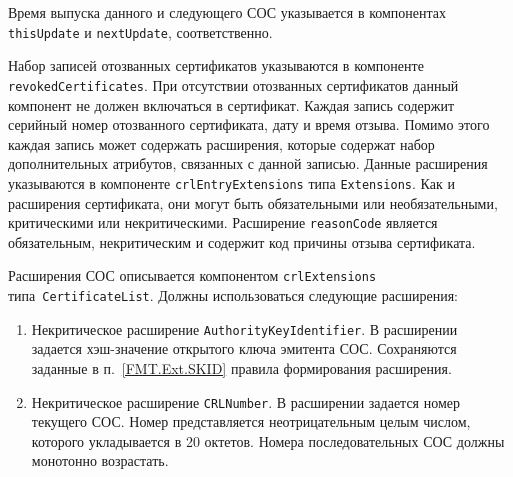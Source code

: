 Время выпуска данного и следующего СОС указывается в 
компонентах \texttt{thisUpdate} и \texttt{nextUpdate}, 
соответственно.

Набор записей отозванных сертификатов указываются в компоненте 
\texttt{revokedCertificates}. При отсутствии отозванных  
сертификатов данный компонент не должен включаться в сертификат.
Каждая запись содержит серийный номер отозванного 
сертификата, дату и время отзыва. Помимо этого
каждая запись может содержать расширения, которые содержат
набор дополнительных атрибутов, связанных с данной записью. 
Данные расширения указываются в компоненте 
\texttt{crlEntryExtensions} типа \texttt{Extensions}. Как 
и расширения сертификата, они могут быть обязательными или необязательными,
критическими или некритическими. Расширение \texttt{reasonCode}
является обязательным, некритическим и содержит код причины 
отзыва сертификата.  



Расширения СОС описывается компонентом \texttt{crlExtensions}
типа~\texttt{CertificateList}. Должны использоваться следующие расширения: 
\begin{enumerate}
\item 
Некритическое расширение \texttt{AuthorityKeyIdentifier}. 
В расширении задается хэш-значение открытого ключа эмитента СОС.
Сохраняются заданные в п.~\ref{FMT.Ext.SKID} правила формирования 
расширения.

\item
Некритическое расширение \texttt{CRLNumber}. 
В расширении задается номер текущего СОС.
Номер представляется неотрицательным целым числом, 
 которого укладывается в 20 октетов. 
Номера последовательных СОС должны монотонно возрастать.
\end{enumerate}
